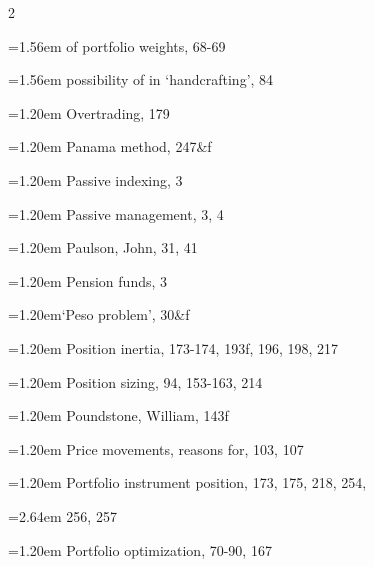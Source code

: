 {\begin{multicols}{2}
\par \noindent\hangindent=1.56em\hspace*{0.36em} of portfolio weights, 68-69
\par \noindent\hangindent=1.56em\hspace*{0.36em} possibility of in ‘handcrafting’, 84
\par \noindent\hangindent=1.20em\hspace*{0.00em} Overtrading, 179
\par \noindent\hangindent=1.20em\hspace*{0.00em} Panama method, 247\&f
\par \noindent\hangindent=1.20em\hspace*{0.00em} Passive indexing, 3
\par \noindent\hangindent=1.20em\hspace*{0.00em} Passive management, 3, 4
\par \noindent\hangindent=1.20em\hspace*{0.00em} Paulson, John, 31, 41
\par \noindent\hangindent=1.20em\hspace*{0.00em} Pension funds, 3
\par \noindent\hangindent=1.20em\hspace*{0.00em}‘Peso problem’, 30\&f
\par \noindent\hangindent=1.20em\hspace*{0.00em} Position inertia, 173-174, 193f, 196, 198, 217
\par \noindent\hangindent=1.20em\hspace*{0.00em} Position sizing, 94, 153-163, 214
\par \noindent\hangindent=1.20em\hspace*{0.00em} Poundstone, William, 143f
\par \noindent\hangindent=1.20em\hspace*{0.00em} Price movements, reasons for, 103, 107
\par \noindent\hangindent=1.20em\hspace*{0.00em} Portfolio instrument position, 173, 175, 218, 254,
\par \noindent\hangindent=2.64em\hspace*{1.44em} 256, 257
\par \noindent\hangindent=1.20em\hspace*{0.00em} Portfolio optimization, 70-90, 167

\end{multicols}}
